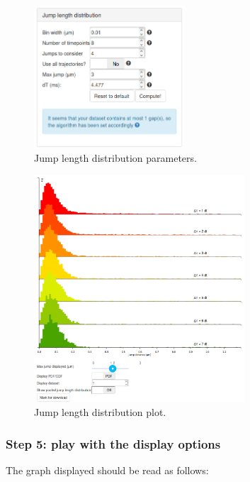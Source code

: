 \begin{figure}[H]
\centering
\includegraphics[width=0.5\textwidth]{../SPTGUI/static/SPTGUI/img/tutorial/0.7/tuto6.png}
\caption{\label{fig:tuto6}Jump length distribution parameters.}
\end{figure}


\begin{figure}[H]
\centering
\includegraphics[width=0.7\textwidth]{../SPTGUI/static/SPTGUI/img/tutorial/0.7/tuto7.png}
\caption{\label{fig:tuto7}Jump length distribution plot.}
\end{figure}

\subsubsection{Step 5: play with the display options}
The graph displayed should be read as follows:

